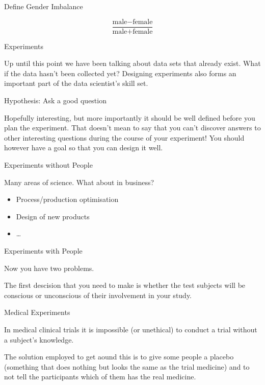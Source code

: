\documentclass{beamer}
\begin{document}
\begin{frame}{Define Gender Imbalance}

\[
\frac{\textrm{male}-\textrm{female}}{\textrm{male}+\textrm{female}}
\]

\end{frame}


\begin{frame}{Experiments}

Up until this point we have been talking about data sets that already exist.  What if the data hasn't been collected yet?  Designing experiments also forms an important part of the data scientist's skill set.

\end{frame}


\begin{frame}{Hypothesis: Ask a good question}

Hopefully interesting, but more importantly it should be well defined before you plan the experiment.  That doesn't mean to say that you can't discover answers to other interesting questions during the course of your experiment!  You should however have a goal so that you can design it well.

\end{frame}



\begin{frame}{Experiments without People}

Many areas of science.  What about in business?

\begin{itemize}
\item Process/production optimisation
\item Design of new products
\item \ldots
\end{itemize}

\end{frame}


\begin{frame}{Experiments with People}

Now you have two problems.  

\vspace{5mm}

The first descision that you need to make is whether the test subjects will be conscious or unconscious of their involvement in your study.  


\end{frame}


\begin{frame}{Medical Experiments}

In medical clinical trials it is impossible (or unethical) to conduct a trial without a subject's knowledge.  


\vspace{5mm}

The solution employed to get aound this is to give some people a placebo (something that does nothing but looks the same as the trial medicine) and to not tell the participants which of them has the real medicine.


\end{frame}
\end{document}

